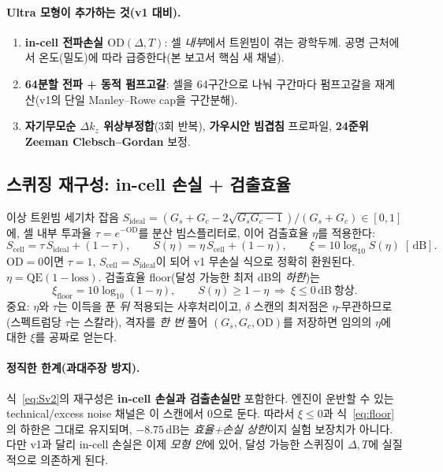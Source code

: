 \documentclass[11pt,a4paper]{article}
\newcommand{\dB}{\,\mathrm{dB}}
\begin{document}
\paragraph{Ultra 모형이 추가하는 것(v1 대비).}
\begin{enumerate}[nosep]
\item \textbf{in-cell 전파손실 $\mathrm{OD}(\Delta,T)$}: 셀 \emph{내부}에서 트윈빔이 겪는
      광학두께. 공명 근처에서 온도(밀도)에 따라 급증한다(본 보고서 핵심 새 채널).
\item \textbf{64분할 전파 + 동적 펌프고갈}: 셀을 64구간으로 나눠 구간마다 펌프고갈을
      재계산(v1의 단일 Manley--Rowe cap을 구간분해).
\item \textbf{자기무모순 $\Delta k_z$ 위상부정합}(3회 반복), \textbf{가우시안 빔겹침} 프로파일,
      \textbf{24준위 Zeeman Clebsch--Gordan} 보정.
\end{enumerate}

\subsection{스퀴징 재구성: in-cell 손실 + 검출효율}
이상 트윈빔 세기차 잡음 $S_{\mathrm{ideal}}=(G_s+G_c-2\sqrt{G_sG_c-1})/(G_s+G_c)\in[0,1]$에,
셀 내부 투과율 $\tau=e^{-\mathrm{OD}}$를 분산 빔스플리터로, 이어 검출효율 $\eta$를 적용한다:
\begin{equation}
S_{\mathrm{cell}}=\tau\,S_{\mathrm{ideal}}+(1-\tau),\qquad
S(\eta)=\eta\,S_{\mathrm{cell}}+(1-\eta),\qquad
\xi=10\log_{10}S(\eta)\;[\dB].
\label{eq:Sv2}
\end{equation}
$\mathrm{OD}=0$이면 $\tau=1$, $S_{\mathrm{cell}}=S_{\mathrm{ideal}}$이 되어 v1 무손실 식으로
정확히 환원된다. $\eta=\mathrm{QE}(1-\mathrm{loss})$. 검출효율 floor(달성 가능한 최저 dB의
\emph{하한})는
\begin{equation}
\xi_{\mathrm{floor}}=10\log_{10}(1-\eta),\qquad
S(\eta)\ge 1-\eta\ \Rightarrow\ \xi\le 0\dB\ \text{항상}.
\label{eq:floor}
\end{equation}
중요: $\eta$와 $\tau$는 이득을 푼 \emph{뒤} 적용되는 사후처리이고, $\delta$ 스캔의 최저점은
$\eta$-무관하므로(스펙트럼당 $\tau$는 스칼라), 격자를 \emph{한 번} 풀어 $(G_s,G_c,\mathrm{OD})$를
저장하면 임의의 $\eta$에 대한 $\xi$를 공짜로 얻는다.

\paragraph{정직한 한계(과대주장 방지).}
식~\eqref{eq:Sv2}의 재구성은 \textbf{in-cell 손실과 검출손실만} 포함한다. 엔진이 운반할 수
있는 technical/excess noise 채널은 이 스캔에서 $0$으로 둔다. 따라서 $\xi\le0$과 식~\eqref{eq:floor}
의 하한은 그대로 유지되며, $-8.75\dB$는 \emph{효율+손실 상한}이지 실험 보장치가 아니다.
다만 v1과 달리 in-cell 손실은 이제 \emph{모형 안}에 있어, 달성 가능한 스퀴징이 $\Delta,T$에
실질적으로 의존하게 된다.
\end{document}
